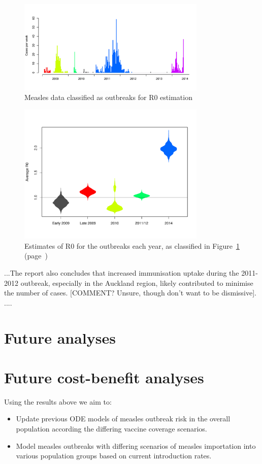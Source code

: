\documentclass{article}
\begin{document}
\begin{figure}
     \centering
     \includegraphics[width=0.8\textwidth]{outbreaks_for_R0.pdf}
     \caption{Measles data classified as outbreaks for R0 estimation}
     \label{fig:outbreaks}
\end{figure}

\begin{figure}
     \centering
     \includegraphics[width=0.8\textwidth]{averageR0.pdf}
     \caption{Estimates of R0 for the outbreaks each year, as classified in Figure~\ref{fig:outbreaks} (page~\pageref{fig:outbreaks})}
\end{figure}

...The report also concludes that increased immunisation uptake during the 2011-2012 outbreak, especially in the Auckland region, likely contributed to minimise the number of cases. [COMMENT? Unsure, though don't want to be dismissive].
....

\section{Future analyses}

\section{Future cost-benefit analyses}
Using the results above we aim to:
\begin{itemize}
\item Update previous ODE models of measles outbreak risk in the overall population according the differing vaccine coverage scenarios.
\item Model measles outbreaks with differing scenarios of measles importation into various population groups based on current introduction rates.
\end{itemize}
\end{document}
